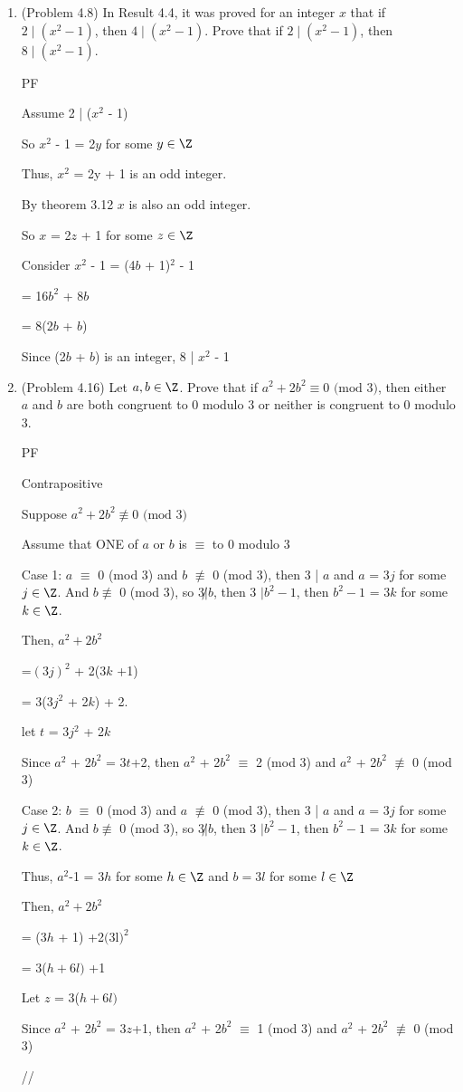 \documentclass[12pt]{article}
\begin{document}
\begin{enumerate}
{}



\item (Problem 4.8) In Result 4.4, it was proved for an integer $x$ that if $2 \mid (x^2 - 1)$, then $4 \mid (x^2 -1)$.  Prove that if $2 \mid (x^2 -1)$, then $8 \mid (x^2 - 1)$.

{PF

Assume 2 | ($x^2$ - 1)

So $x^2$ - 1 = 2$y$ for some  $y \in \Z$

Thus, $x^2$ = 2y + 1 is an odd integer.

By theorem 3.12 $x$ is also an odd integer.

So $x$ = 2$z$ + 1 for some $z \in \Z$

Consider $x^2$ - 1 = (4$b$ + 1)$^2$ - 1 

= 16$b^2$ + 8$b$ 

= 8(2$b$ + $b$)

Since (2$b$ + $b$) is an integer, 8 | $x^2$ - 1


}



\item (Problem 4.16) Let $a, b \in \Z$.  Prove that if $a^2 + 2b^2 \equiv 0 \text{ (mod 3)}$, then either $a$ and $b$ are both congruent to 0 modulo 3 or neither is congruent to 0 modulo 3.


{PF

Contrapositive

Suppose $a^2 + 2b^2 \not\equiv 0 \text{ (mod 3)}$

Assume that  ONE of $a$ or $b$ is $\equiv$ to 0 modulo 3

Case 1:
$a$ $\equiv$ 0 (mod 3) and $b$ $\not\equiv$ 0 (mod 3), then 3 | $a$ and $a$ = 3$j$ for some $j \in \Z$.
And $b \not\equiv$ 0 (mod 3), so 3$ \not | b$, then 3 $|$$ b^2 -1$, then  $b^2 -1$ = 3$k$ for some $k \in 
\Z$.

Then, $a^2 +2b^2$ 

=$(3j)^2$ + 2(3$k$ +1)

=  3(3$j^2$ + 2$k$) + 2.

let $t$ = 3$j^2$ + 2$k$

Since $a^2$ + 2$b^2$ = 3$t$+2, then $a^2$ + 2$b^2$ $\equiv$ 2 (mod 3) and  $a^2$ + 2$b^2$ $\not\equiv$ 0 (mod 3) 


Case 2:
$b$ $\equiv$ 0 (mod 3) and $a$ $\not\equiv$ 0 (mod 3), then 3 | $a$ and $a$ = 3$j$ for some $j \in \Z$.
And $b \not\equiv$ 0 (mod 3), so 3$ \not | b$, then 3 $|$$ b^2 -1$, then  $b^2 -1$ = 3$k$ for some $k \in 
\Z$.

Thus, $a^2$-1 = 3$h$ for some $h \in \Z$  and $b = 3l$ for some $l \in \Z$

Then, $a^2 +2b^2$

 = (3$h$ + 1) +2$(3$l$)^2$
 
 = 3($h + 6l)$ +1
 
 Let $z$ = 3($h + 6l)$
 
 Since  $a^2$ + 2$b^2$ = 3$z$+1, then $a^2$ + 2$b^2$ $\equiv$ 1 (mod 3) and  $a^2$ + 2$b^2$ $\not\equiv$ 0 (mod 3) 




//}




\end{enumerate}
\end{document}
